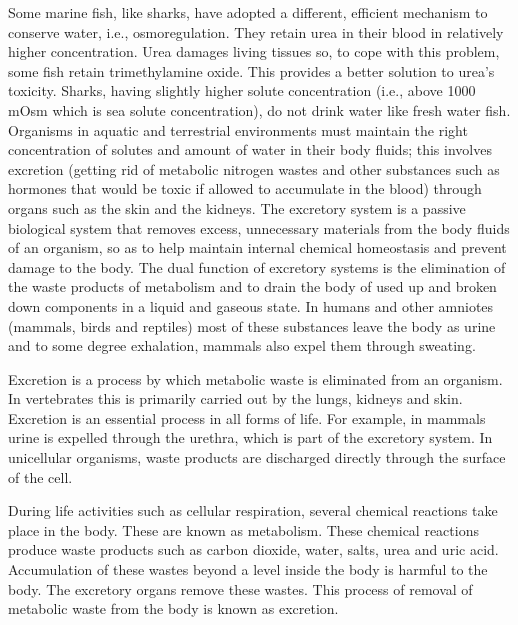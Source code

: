 Some marine fish, like sharks, have adopted a different, efficient mechanism to conserve water, i.e., osmoregulation. They retain urea in their blood in relatively higher concentration. Urea damages living tissues so, to cope with this problem, some fish retain trimethylamine oxide. This provides a better solution to urea's toxicity. Sharks, having slightly higher solute concentration (i.e., above 1000 mOsm which is sea solute concentration), do not drink water like fresh water fish.
Organisms in aquatic and terrestrial environments must maintain the right concentration of solutes and amount of water in their body fluids; this involves excretion (getting rid of metabolic nitrogen wastes and other substances such as hormones that would be toxic if allowed to accumulate in the blood) through organs such as the skin and the kidneys.
The excretory system is a passive biological system that removes excess, unnecessary materials from the body fluids of an organism, so as to help maintain internal chemical homeostasis and prevent damage to the body. The dual function of excretory systems is the elimination of the waste products of metabolism and to drain the body of used up and broken down components in a liquid and gaseous state. In humans and other amniotes (mammals, birds and reptiles) most of these substances leave the body as urine and to some degree exhalation, mammals also expel them through sweating.

Excretion is a process by which metabolic waste is eliminated from an organism. In vertebrates this is primarily carried out by the lungs, kidneys and skin. Excretion is an essential process in all forms of life. For example, in mammals urine is expelled through the urethra, which is part of the excretory system. In unicellular organisms, waste products are discharged directly through the surface of the cell.

During life activities such as cellular respiration, several chemical reactions take place in the body. These are known as metabolism. These chemical reactions produce waste products such as carbon dioxide, water, salts, urea and uric acid. Accumulation of these wastes beyond a level inside the body is harmful to the body. The excretory organs remove these wastes. This process of removal of metabolic waste from the body is known as excretion.


